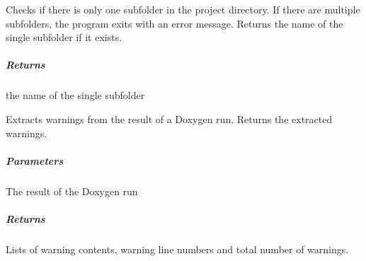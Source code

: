 \documentclass[letterpaper,10pt,english]{sphinxmanual}
\begin{document}
\begin{fulllineitems}
\begin{fulllineitems}
\label{\detokenize{main.doxygen_management:main.doxygen_management.doxy_warning_detector.DoxyWarningDetector.check_project_directory}}
\pysigstartsignatures
{}
\pysigstopsignatures
\sphinxAtStartPar
Checks if there is only one subfolder in the project directory.
If there are multiple subfolders, the program exits with an error message.
Returns the name of the single subfolder if it exists.


\subparagraph{Returns}
\label{\detokenize{main.doxygen_management:returns}}\begin{description}
\sphinxAtStartPar
the name of the single subfolder

\end{description}

\end{fulllineitems}


\begin{fulllineitems}
\label{\detokenize{main.doxygen_management:main.doxygen_management.doxy_warning_detector.DoxyWarningDetector.extract_warnings}}
\pysigstartsignatures
{}
\pysigstopsignatures
\sphinxAtStartPar
Extracts warnings from the result of a Doxygen run.
Returns the extracted warnings.


\subparagraph{Parameters}
\label{\detokenize{main.doxygen_management:parameters}}\begin{description}
\sphinxAtStartPar
The result of the Doxygen run

\end{description}


\subparagraph{Returns}
\label{\detokenize{main.doxygen_management:id1}}\begin{description}
\sphinxAtStartPar
Lists of warning contents, warning line numbers and total number of warnings.

\end{description}

\end{fulllineitems}


\end{fulllineitems}
\end{document}
